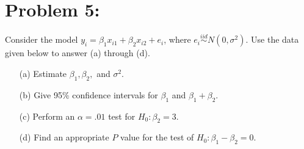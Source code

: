 \documentclass[11pt]{article}
\begin{document}
\section*{Problem 5:}
Consider the model $y_i = \beta_1x_{i1} + \beta_2x_{i2} + e_i$, where $e_i \overset{iid}{\sim} N(0,\sigma^2)$.  Use the data given below to answer (a) through (d).
\begin{itemize}
\item[(a)] Estimate $\beta_1,\beta_2,$ and $\sigma^2$.
\item[(b)] Give 95$\%$ confidence intervals for $\beta_1$ and $\beta_1 + \beta_2$.
\item[(c)] Perform an $\alpha = .01$ test for $H_0\colon \beta_2 = 3$.
\item[(d)] Find an appropriate $P$ value for the test of $H_0\colon \beta_1 - \beta_2 = 0$.
\end{itemize}
\end{document}
